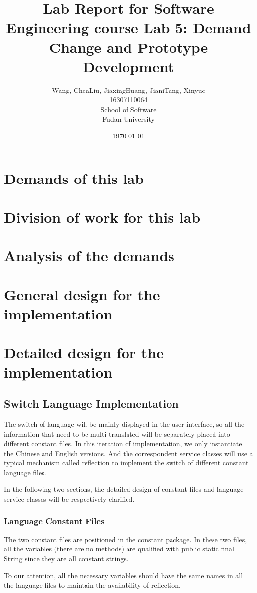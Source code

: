 \documentclass[a4paper]{report}
\title{Lab Report for Software Engineering course \newline
 Lab 5: Demand Change and Prototype Development}
\author{Wang, Chen\qquad Liu, Jiaxing\qquad Huang, Jiani\qquad Tang, Xinyue \\
16307110064\qquad17302010049\qquad 17302010063\qquad 16307110476 \\
School of Software\\
Fudan University
}
\date{\today}
\begin{document}
\maketitle

\tableofcontents
\chapter{Demands of this lab}



\chapter{Division of work for this lab}



\chapter{Analysis of the demands}



\chapter{General design for the implementation}



\chapter{Detailed design for the implementation}

\section{Switch Language Implementation}
\par The switch of language will be mainly displayed in the user interface, so all the information that need to be multi-translated will be separately placed into  different constant files. In this iteration of implementation, we only instantiate the Chinese and English versions. And the correspondent service classes will use a typical mechanism called reflection to implement the switch of different constant language files.
\par In the following two sections, the detailed design of constant files and language service classes will be respectively clarified.
\subsection{Language Constant Files}
\par The two constant files are positioned in the constant package. In these two files, all the variables (there are no methods) are qualified with public static final String since they are all constant strings.
\par To our attention, all the necessary variables should have the same names in all the language files to maintain the availability of reflection.
\end{document}
